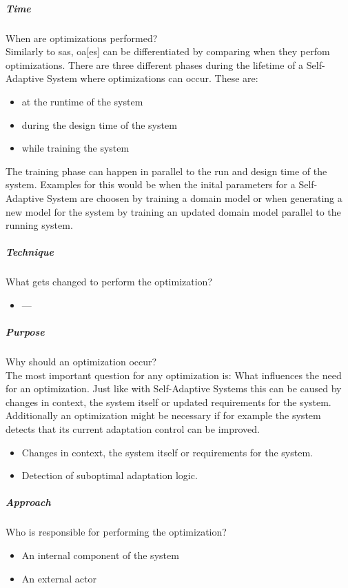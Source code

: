 \subparagraph*{Time}
When are optimizations performed? \\
Similarly to \acrshort{sas}, \acrlong{oa}[es] can be differentiated by comparing when they perfom optimizations.
There are three different phases during the lifetime of a Self-Adaptive System where optimizations can occur.
These are:
\begin{itemize}
    \item at the runtime of the system
    \item during the design time of the system
    \item while training the system
\end{itemize}
The training phase can happen in parallel to the run and design time of the system.
Examples for this would be when the inital parameters for a Self-Adaptive System are choosen by training a domain model
or when generating a new model for the system by training an updated domain model parallel to the running system.

\subparagraph*{Technique}
What gets changed to perform the optimization? \\
\begin{itemize}
    \item ---
\end{itemize}

\subparagraph*{Purpose}
Why should an optimization occur? \\
The most important question for any optimization is: What influences the need for an optimization.
Just like with Self-Adaptive Systems this can be caused by changes in context, the system itself or updated requirements for the system.
Additionally an optimization might be necessary if for example the system detects that its current adaptation control can be improved.

\begin{itemize}
    \item Changes in context, the system itself or requirements for the system.
    \item Detection of suboptimal adaptation logic.
\end{itemize}

\subparagraph*{Approach}
Who is responsible for performing the optimization? \\
\begin{itemize}
    \item An internal component of the system
    \item An external actor
\end{itemize}

